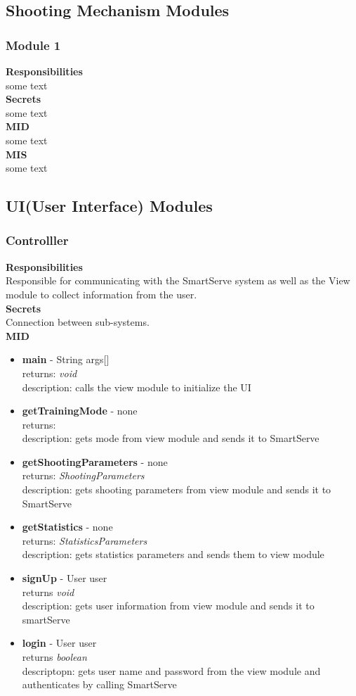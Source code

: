 \documentclass[11pt]{article}
\begin{document}
\subsection{Shooting Mechanism Modules}
\subsubsection*{Module 1}
\textbf{Responsibilities} \\
some text \\
\textbf{Secrets} \\ 
some text \\ 
\textbf{MID} \\
some text \\
\textbf{MIS} \\
some text \\
\subsection{UI(User Interface) Modules}
\subsubsection*{Controlller}
\textbf{Responsibilities} \\
Responsible for communicating with the SmartServe system as well as the View module to collect information from the user. \\
\textbf{Secrets} \\ 
Connection between sub-systems. \\ 
\textbf{MID} \\
\begin{itemize}
\item \textbf{main} - String args[] \\ returns: \textit{void} \\ description: calls the view module to initialize the UI
\item \textbf{getTrainingMode} - none \\ returns:  \\ description: gets mode from view module and sends it to SmartServe
\item \textbf{getShootingParameters} - none \\ returns: \textit{ShootingParameters} \\ description: gets shooting parameters from view module and sends it to SmartServe
\item \textbf{getStatistics} - none \\ returns: \textit{StatisticsParameters} \\ description: gets statistics parameters and sends them to view module
\item \textbf{signUp} - User user \\ returns \textit{void} \\ description: gets user information from view module and sends it to smartServe
\item \textbf{login} - User user \\ returns \textit{boolean} \\ descriptopn: gets user name and password from the view module and authenticates by calling SmartServe
\end{itemize}
\end{document}
